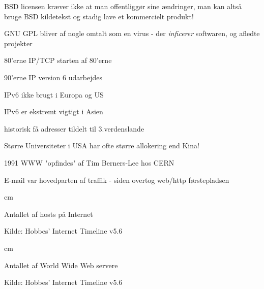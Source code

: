 
\begin{list1}
 \item BSD licensen kræver ikke at man offentliggør sine ændringer,
 man kan altså bruge BSD kildetekst og stadig lave et kommercielt
 produkt!
\item GNU GPL bliver af nogle omtalt som en virus - der
  \emph{inficerer} softwaren, og afledte projekter
\end{list1}




\begin{list1}
\item 80'erne IP/TCP starten af 80'erne
\item 90'erne IP version 6 udarbejdes
  \begin{list2}
  \item IPv6 ikke brugt i Europa og US
  \item IPv6 er ekstremt vigtigt i Asien 
  \item historisk få adresser tildelt til 3.verdenslande
  \item Større Universiteter i USA har ofte større allokering end Kina!
  \end{list2}
\item 1991 WWW "opfindes" af Tim Berners-Lee hos CERN
\item E-mail var hovedparten af traffik
  - siden overtog web/http førstepladsen
\end{list1}


 cm

\centerline{Antallet af hosts på Internet}


\begin{list1}
\item Kilde: 
Hobbes' Internet Timeline v5.6\\
\end{list1}


 cm

\centerline{Antallet af World Wide Web servere}


\begin{list1}
\item Kilde: Hobbes' Internet Timeline v5.6\\
\end{list1}


